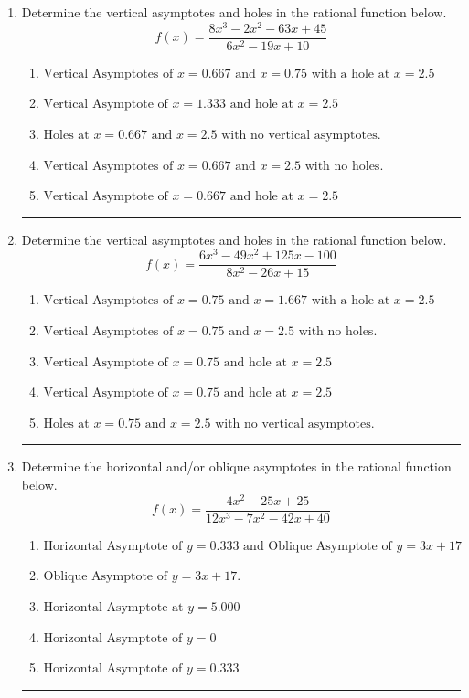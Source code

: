 \documentclass[14pt]{extbook}
\newcommand{\litem}[1]{\item#1\hspace*{-1cm}\rule{\textwidth}{0.4pt}}
\begin{document}
\begin{enumerate}
{\begin{enumerate}[label=\Alph*.]
\end{enumerate} }
\litem{
Determine the vertical asymptotes and holes in the rational function below.\[ f(x) = \frac{8x^{3} -2 x^{2} -63 x + 45}{6x^{2} -19 x + 10} \]\begin{enumerate}[label=\Alph*.]
\item \( \text{Vertical Asymptotes of } x = 0.667 \text{ and } x = 0.75 \text{ with a hole at } x = 2.5 \)
\item \( \text{Vertical Asymptote of } x = 1.333 \text{ and hole at } x = 2.5 \)
\item \( \text{Holes at } x = 0.667 \text{ and } x = 2.5 \text{ with no vertical asymptotes.} \)
\item \( \text{Vertical Asymptotes of } x = 0.667 \text{ and } x = 2.5 \text{ with no holes.} \)
\item \( \text{Vertical Asymptote of } x = 0.667 \text{ and hole at } x = 2.5 \)

\end{enumerate} }
\litem{
Determine the vertical asymptotes and holes in the rational function below.\[ f(x) = \frac{6x^{3} -49 x^{2} +125 x -100}{8x^{2} -26 x + 15} \]\begin{enumerate}[label=\Alph*.]
\item \( \text{Vertical Asymptotes of } x = 0.75 \text{ and } x = 1.667 \text{ with a hole at } x = 2.5 \)
\item \( \text{Vertical Asymptotes of } x = 0.75 \text{ and } x = 2.5 \text{ with no holes.} \)
\item \( \text{Vertical Asymptote of } x = 0.75 \text{ and hole at } x = 2.5 \)
\item \( \text{Vertical Asymptote of } x = 0.75 \text{ and hole at } x = 2.5 \)
\item \( \text{Holes at } x = 0.75 \text{ and } x = 2.5 \text{ with no vertical asymptotes.} \)

\end{enumerate} }
\litem{
Determine the horizontal and/or oblique asymptotes in the rational function below.\[ f(x) = \frac{4x^{2} -25 x + 25}{12x^{3} -7 x^{2} -42 x + 40} \]\begin{enumerate}[label=\Alph*.]
\item \( \text{Horizontal Asymptote of } y = 0.333 \text{ and Oblique Asymptote of } y = 3x + 17 \)
\item \( \text{Oblique Asymptote of } y = 3x + 17. \)
\item \( \text{Horizontal Asymptote at } y = 5.000 \)
\item \( \text{Horizontal Asymptote of } y = 0 \)
\item \( \text{Horizontal Asymptote of } y = 0.333  \)


\end{enumerate}}
\end{enumerate}
\end{document}
